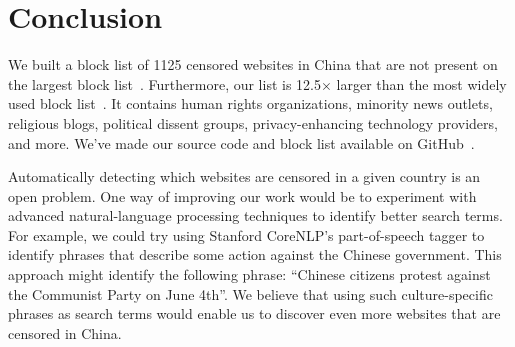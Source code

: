 
\section{Conclusion}
We built a block list of 1125 censored websites in China that are not
present on the largest block
list~\cite{darer2017filteredweb}. Furthermore, our list is
12.5$\times$ larger than the most widely used block
list~\cite{citizenlab:block}. It contains human rights organizations,
minority news outlets, religious blogs, political dissent groups,
privacy-enhancing technology providers, and more. We've made our
source code and block list available on
GitHub~\cite{censorsearch-lists}.

Automatically detecting which websites are censored in a given country
is an open problem.  One way of improving our work would be to
experiment with advanced natural-language processing techniques to
identify better search terms. For example, we could try using Stanford
CoreNLP's part-of-speech tagger to identify phrases that describe some
action against the Chinese government. This approach might identify
the following phrase: ``Chinese citizens protest against the Communist
Party on June 4th''. We believe that using such culture-specific
phrases as search terms would enable us to discover even more websites
that are censored in China.
